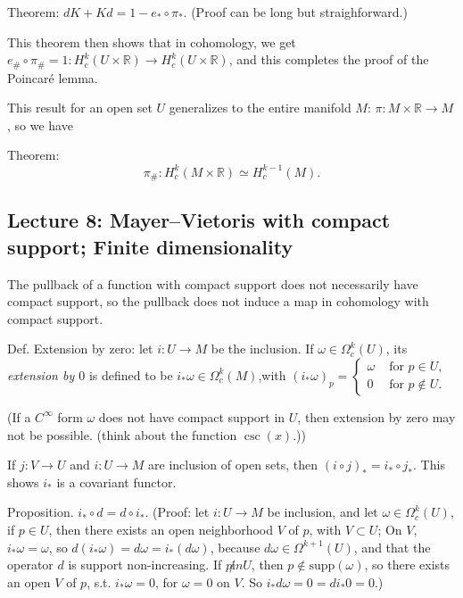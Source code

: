 \documentclass{article}
\theoremstyle{mystyle}
\theoremstyle{remark}
\numberwithin{equation}{section}
\begin{document}
Theorem: $dK+Kd = 1- e_*\circ \pi_*$. (Proof can be long but straighforward.)

This theorem then shows that in cohomology, we get $e_\#\circ \pi_\# = 1\colon H^k_c(U\times \mathbb{R})\rightarrow H^k_c(U\times \mathbb{R})$, and this completes the proof of the Poincar\'e lemma.

This result for an open set $U$ generalizes to the entire manifold $M$: $\pi\colon M\times \mathbb{R}\rightarrow M$, so we have

Theorem:
$$\pi_\#\colon H^k_c(M\times \mathbb{R})\simeq H^{k-1}_c(M).$$



\subsection{Lecture 8: Mayer--Vietoris with compact support; Finite dimensionality}



The pullback of a function with compact support does not necessarily have compact support, so the pullback does not induce a map in cohomology with compact support.

Def. Extension by zero: let $i\colon U \rightarrow M$ be the inclusion. If $\omega \in \Omega^k_c(U)$, its \emph{extension by $0$} is defined to be $i_*\omega \in \Omega^k_c(M)$,with $(i_*\omega)_p = \left\{\begin{array}{cc} \omega & \text{ for }p\in U,\\ 0 & \text{ for } p\notin U.\end{array}\right.$

(If a $C^\infty$ form $\omega$ does not have compact support in $U$, then extension by zero may not be possible. (think about the function $\csc(x)$.))

If $j\colon V\rightarrow U$ and $i\colon U\rightarrow M$ are inclusion of open sets, then $(i\circ j)_*=i_*\circ j_*$. This shows $i_*$ is a covariant functor.

Proposition. $i_*\circ d = d\circ i_*$. (Proof: let $i\colon U\rightarrow M$ be inclusion, and let $\omega \in \Omega^k_c(U)$, if $p \in U$, then there exists an open neighborhood $V$ of $p$, with $V\subset U$; On $V$, $i_*\omega = \omega$, so $d(i_*\omega) = d\omega =i_*(d\omega)$, because $d\omega\in\Omega^{k+1}(U)$, and that the operator $d$ is support non-increasing. If $p\not in U$, then $p\notin \text{supp}(\omega)$, so there exists an open $V$ of $p$, s.t. $i_*\omega = 0$, for $\omega=0$ on $V$. So $i_*d\omega = 0 = di_*0 =0$.)
\end{document}
